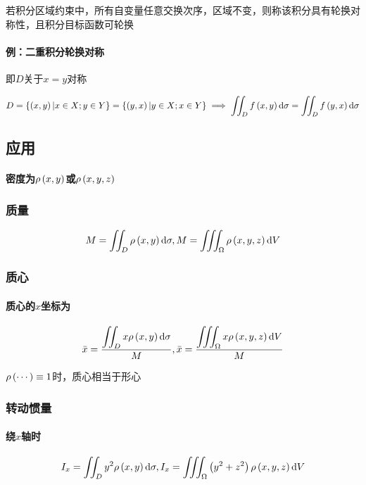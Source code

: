 \documentclass{article}
\begin{document}
若积分区域约束中，所有自变量任意交换次序，区域不变，则称该积分具有轮换对称性，且积分目标函数可轮换

\paragraph{例：二重积分轮换对称} 即$D$关于$x=y$对称

\[D=\left\{\left(x,y\right)|x\in X;y\in Y\right\}=\left\{\left(y,x\right)|y\in X;x\in Y\right\}
    \implies\iint_Df\left(x,y\right)\mathrm d\sigma=\iint_Df\left(y,x\right)\mathrm d\sigma\]

\subsection{应用}

\paragraph{密度为$\rho\left(x,y\right)$或$\rho\left(x,y,z\right)$}

\subsubsection{质量}

\[M=\iint_D\rho\left(x,y\right)\mathrm d\sigma,
    M=\iiint_\Omega\rho\left(x,y,z\right)\mathrm d V\]

\subsubsection{质心}

\paragraph{质心的$x$坐标为}

\[\bar x=\frac{\displaystyle\iint_Dx\rho\left(x,y\right)\mathrm d\sigma}M,
    \bar x=\frac{\displaystyle\iiint_\Omega x\rho\left(x,y,z\right)\mathrm d V}M\]

$\rho\left(\cdots\right)\equiv1$时，质心相当于形心

\subsubsection{转动惯量}

\paragraph{绕$x$轴时}

\[I_x=\iint_Dy^2\rho\left(x,y\right)\mathrm d\sigma,
    I_x=\iiint_\Omega\left(y^2+z^2\right)\rho\left(x,y,z\right)\mathrm d V\]
\end{document}
